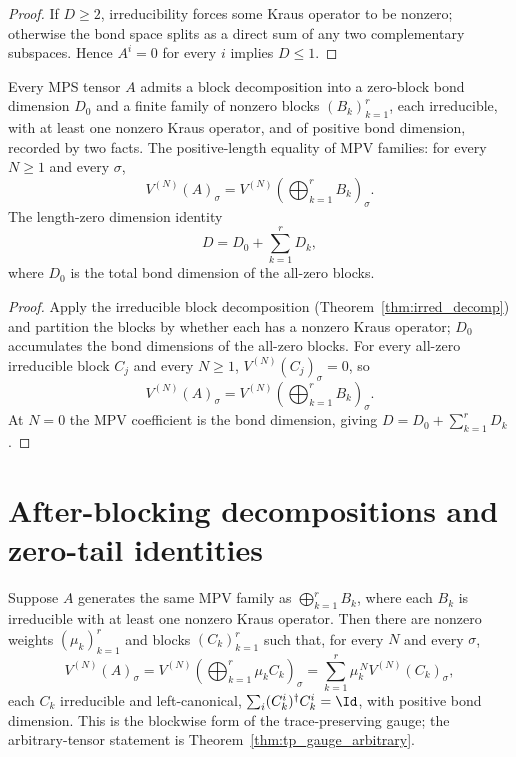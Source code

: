 \begin{proof}\leanok
    If $D \ge 2$, irreducibility forces some Kraus operator to be nonzero;
    otherwise the bond space splits as a direct sum of any two complementary
    subspaces. Hence $A^i = 0$ for every $i$ implies $D \le 1$.
\end{proof}

\begin{theorem}%
    \label{thm:zero_block_separation}
    \leanok
    Every MPS tensor $A$ admits a block decomposition into a zero-block bond
    dimension $D_0$ and a finite family of nonzero blocks $(B_k)_{k=1}^r$, each
    irreducible, with at least one nonzero Kraus operator, and of positive bond
    dimension, recorded by two facts. The positive-length equality of MPV
    families: for every $N \ge 1$ and every $\sigma$,
    \[
        V^{(N)}(A)_\sigma
        = V^{(N)}\!(\textstyle\bigoplus_{k=1}^r B_k)_\sigma.
    \]
    The length-zero dimension identity
    \[
        D = D_0 + \sum_{k=1}^r D_k,
    \]
    where $D_0$ is the total bond dimension of the all-zero blocks.
\end{theorem}

\begin{proof}\leanok
    Apply the irreducible block decomposition (Theorem~\ref{thm:irred_decomp})
    and partition the blocks by whether each has a nonzero Kraus operator; $D_0$
    accumulates the bond dimensions of the all-zero blocks. For every all-zero
    irreducible block $C_j$ and every $N \ge 1$, $V^{(N)}(C_j)_\sigma = 0$, so
    \[
        V^{(N)}(A)_\sigma
        = V^{(N)}\!(\textstyle\bigoplus_{k=1}^r B_k)_\sigma.
    \]
    At $N = 0$ the MPV coefficient is the bond dimension, giving
    $D = D_0 + \sum_{k=1}^r D_k$.
\end{proof}

\section{After-blocking decompositions and zero-tail identities}

\begin{theorem}%
    \label{thm:blockwise_tp_gauge}
    \leanok
    Suppose $A$ generates the same MPV family as $\bigoplus_{k=1}^r B_k$, where
    each $B_k$ is irreducible with at least one nonzero Kraus operator. Then there
    are nonzero weights $(\mu_k)_{k=1}^r$ and blocks $(C_k)_{k=1}^r$ such that, for
    every $N$ and every $\sigma$,
    \[
        V^{(N)}(A)_\sigma
        =
        V^{(N)}\!(\textstyle\bigoplus_{k=1}^r \mu_k C_k)_\sigma
        =
        \sum_{k=1}^r \mu_k^{\,N} V^{(N)}(C_k)_\sigma,
    \]
    each $C_k$ irreducible and left-canonical,
    $\sum_i (C_k^i)^\dagger C_k^i = \Id$, with positive bond dimension. This is
    the blockwise form of the trace-preserving gauge; the arbitrary-tensor
    statement is Theorem~\ref{thm:tp_gauge_arbitrary}.
\end{theorem}

